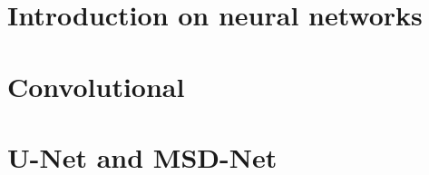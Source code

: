 \chapter{Introduction on neural networks}\label{chp:phasing}
\chapter{Convolutional}\label{chp:phasing}
\chapter{U-Net and MSD-Net}\label{chp:phasing}
